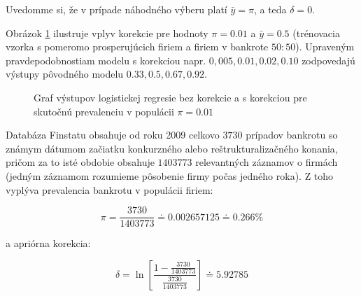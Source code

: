 Uvedomme si, že v prípade náhodného výberu platí \( \bar{y} = \pi \), a teda \( \delta = 0 \).

Obrázok \ref{correction_demo} ilustruje vplyv korekcie pre hodnoty \( \pi = 0.01 \) a \( \bar{y} = 0.5 \) (trénovacia vzorka s pomeromo prosperujúcich firiem a firiem v bankrote \(50:50\)).
Upraveným pravdepodobnostiam modelu s korekciou napr. \(0,005, 0.01, 0.02, 0.10\) zodpovedajú výstupy pôvodného modelu \(0.33, 0.5, 0.67, 0.92\).

\begin{figure}
\caption{Graf výstupov logistickej regresie bez korekcie a s korekciou pre skutočnú prevalenciu v populácii \( \pi = 0.01\)}
\label{correction_demo}
\end{figure}

Databáza Finstatu obsahuje od roku 2009 celkovo \(3730\) prípadov bankrotu so známym dátumom začiatku konkurzného alebo reštrukturalizačného konania,
pričom za to isté obdobie obsahuje \(1 403 773\) relevantných záznamov o firmách (jedným záznamom rozumieme pôsobenie firmy počas jedného roka).
Z toho vyplýva prevalencia bankrotu v populácii firiem:

\[
    \pi = \frac{3730}{1403773} \doteq 0.002657125 \doteq 0.266 \%   
\]

a apriórna korekcia:

\[
    \delta = \ln \left[  \frac{1 - \frac{3730}{1403773}}{\frac{3730}{1403773}} \right] \doteq 5.92785
\]


